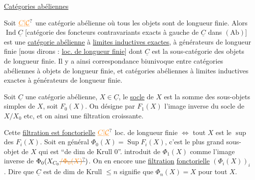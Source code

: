 \uline{Catégories abéliennes}

Soit $\unsure{\underline{C}|\underline{\mathcal{C}}}$ une catégorie abélienne où tous les objets sont de longueur finie. Alors $\operatorname{Ind}\underline{C}$ [catégorie des foncteurs contravariants exacts à gauche de $\underline{C}$ dans  $(\mathrm{Ab})$] est une \uline{catégorie abélienne} à \uline{limites inductives exactes}, à générateurs de longueur finie [nous dirons : \uline{loc. de longueur finie}] dont $\underline{C}$ est la sous-catégorie des objets de longueur finie. Il y a ainsi  correspondance biunivoque entre catégories abéliennes à objets de longueur finie, et catégories abéliennes à limites inductives exactes à générateurs de longueur finie.

Soit $\underline{C}$ une catégorie abélienne, $X\in\underline{C}$, le \uline{socle} de $X$ est la  somme des sous-objets simples de $X$, soit $F_0(X)$. On désigne par $F_1(X)$ l'image inverse du socle de $X/X_0$ etc, et on  ainsi une filtration croissante. 

Cette \uline{filtration est fonctorielle} $\unsure{\underline{C}|\underline{\mathcal{C}}}$ loc. de longueur finie $\Leftrightarrow$ tout $X$ est le $\sup$ des $F_i(X)$. Soit en général $\Phi_0(X)=\operatorname{Sup}F_i(X)$, c'est le plus grand sous-objet de $X$ qui est ``de dim de Krull 0''.
 introduit de  $\Phi_1(X)$ comme l'image inverse de $\Phi_0(X_{C_0}\deleted{\unsure{/\Phi_0(X)}})$. On en  encore une \uline{filtration} \uline{fonctorielle} $(\Phi_i(X))_i$. Dire que $\underline{C}$ est de dim de Krull $\leq n$ signifie que $\Phi_n(X)=X$ pour tout $X$.


